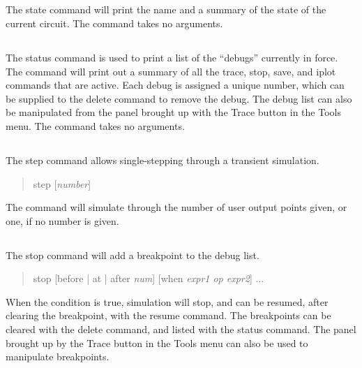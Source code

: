 \subsection{}


The {\cb state} command will print the name and a summary of the state
of the current circuit.  The command takes no arguments.

\subsection{}


The {\cb status} command is used to print a list of the ``debugs''
currently in force.  The command will print out a summary of all the
{\cb trace}, {\cb stop}, {\cb save}, and {\cb iplot} commands that
are active.  Each debug is assigned a unique number, which can be
supplied to the {\cb delete} command to remove the debug.  The debug
list can also be manipulated from the panel brought up with the {\cb
Trace} button in the {\cb Tools} menu.  The command takes no
arguments.

\subsection{}


The {\cb step} command allows single-stepping through a transient
simulation.
\begin{quote}\vt
step [{\it number\/}]
\end{quote}
The command will simulate through the number of user output points
given, or one, if no number is given.

\subsection{}


The {\cb stop} command will add a breakpoint to the debug list.
\begin{quote}\vt
stop [before | at | after {\it num\/}] [when {\it expr1 op expr2\/}] ...
\end{quote}
When the condition is true, simulation will stop, and can be resumed,
after clearing the breakpoint, with the {\cb resume} command.  The
breakpoints can be cleared with the {\cb delete} command, and listed
with the {\cb status} command.  The panel brought up by the {\cb
Trace} button in the {\cb Tools} menu can also be used to manipulate
breakpoints.

